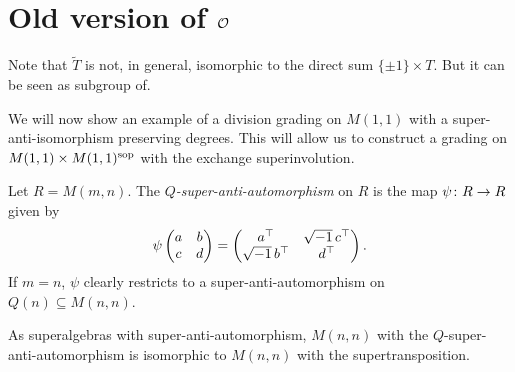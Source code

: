 \section{Old version of $\mathcal O$}

Note that $\widetilde T$ is not, in general, isomorphic to the direct sum $\{ \pm 1 \} \times T$. 
But it can be seen as subgroup of.

We will now show an example of a division grading on $M(1,1)$ with a super-anti-isomorphism preserving degrees. 
This will allow us to construct a grading on $M(1,1) \times M(1,1)^{\mathrm{sop}}$ with the exchange superinvolution.

\begin{defi}
    Let $R = M(m,n)$. 
    The \emph{$Q$-super-anti-automorphism} on $R$ is the map 
    $\psi\colon R \to R$ given by
    \[
        \psi \begin{pmatrix}
        a & b\\
        c & d
        \end{pmatrix} =
        \begin{pmatrix}
        a^{\top}             & \sqrt{-1}\, c^{\top}\\
        \sqrt{-1}\, b^{\top} & d^{\top}
        \end{pmatrix}.
    \]
    If $m = n$, $\psi$ clearly restricts to a super-anti-automorphism on $Q(n) \subseteq M(n,n)$.
\end{defi}

\begin{remark}
    As superalgebras with super-anti-automorphism, $M(n,n)$ with the $Q$-super-anti-automorphism is isomorphic to $M(n,n)$ with the supertransposition.
\end{remark}

